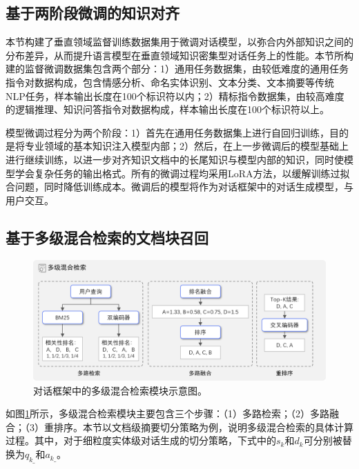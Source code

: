 \subsection{基于两阶段微调的知识对齐}

本节构建了垂直领域监督训练数据集用于微调对话模型，以弥合内外部知识之间的分布差异，从而提升语言模型在垂直领域知识密集型对话任务上的性能。本节所构建的监督微调数据集包含两个部分：1）通用任务数据集，由较低难度的通用任务指令对数据构成，包含情感分析、命名实体识别、文本分类、文本摘要等传统NLP任务，样本输出长度在100个标识符以内；2）精标指令数据集，由较高难度的逻辑推理、知识问答指令对数据构成，样本输出长度在100个标识符以上。

模型微调过程分为两个阶段：1）首先在通用任务数据集上进行自回归训练，目的是将专业领域的基本知识注入模型内部；2）然后，在上一步微调后的模型基础上进行继续训练，以进一步对齐知识文档中的长尾知识与模型内部的知识，同时使模型学会复杂任务的输出格式。所有的微调过程均采用LoRA方法，以缓解训练过拟合问题，同时降低训练成本。微调后的模型将作为对话框架中的对话生成模型，与用户交互。

\subsection{基于多级混合检索的文档块召回}

\begin{figure}[htbp]
	\centering
	\includegraphics[scale=0.55]{Fig/search_module.png}
	\caption{\label{search_module}对话框架中的多级混合检索模块示意图。}
\end{figure}

如图\ref{search_module}所示，多级混合检索模块主要包含三个步骤：（1）多路检索；（2）多路融合；（3）重排序。本节以文档级摘要切分策略为例，说明多级混合检索的具体计算过程。其中，对于细粒度实体级对话生成的切分策略，下式中的$s_k$和$d_k$可分别被替换为$q_{k\_}$和$a_{k\_}$。

